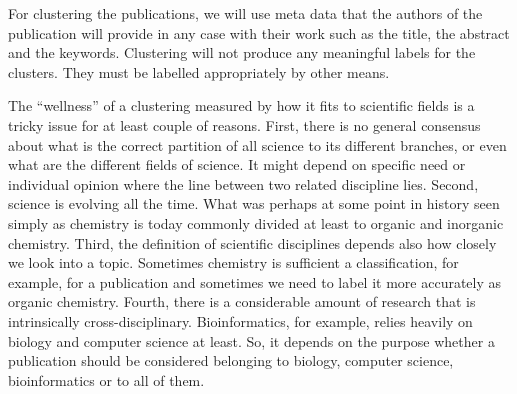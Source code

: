 For clustering the publications, we will use meta data that the authors 
of the publication will provide in any case with their work such 
as the title, the abstract and the keywords. 
Clustering will not produce any meaningful labels for the 
clusters. They must be labelled appropriately by other means. 

The ``wellness'' of a clustering measured by how it fits to 
scientific fields is a tricky issue for at least couple of 
reasons.
First, there is no general consensus about what is the correct 
partition of all science to its different branches, or even what
are the different fields of science. It might depend 
on specific need or individual opinion where the line between two 
related discipline lies.
Second, science is evolving all the time. What was perhaps at some 
point in history seen simply as chemistry is today commonly 
divided at least to organic and inorganic chemistry.
Third, the definition of scientific disciplines depends also how 
closely we look into a topic. Sometimes chemistry is sufficient a
classification, for example, for a publication and sometimes we need 
to label it more accurately as organic chemistry.
Fourth, there is a considerable amount of research that is 
intrinsically cross-disciplinary. Bioinformatics, for example, relies
heavily on biology and computer science at least. So, it depends on the 
purpose whether a publication should be considered belonging to
biology, computer science, bioinformatics or to all of them.




